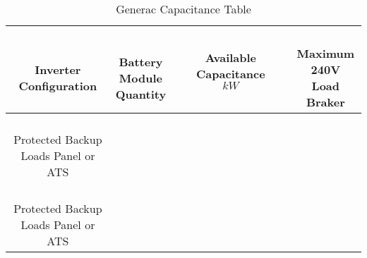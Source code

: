 \documentclass{article}
\begin{document}
\begin{table}[h!]%
\caption{Generac Capacitance Table}%
\centering%
\begin{tabular}{| c | c | c | c | }%
\hline%
\parbox{90pt}{\hfill\\[-0.3em] \centering \textbf{Inverter} \\ \textbf{Configuration}\\[0.1em]} &%
\parbox{60pt}{\hfill\\[-0.3em] \centering \textbf{Battery} \\ \textbf{Module} \\ \textbf{Quantity}\\[0.1em]} &%
\parbox{60pt}{\hfill\\[-0.3em] \centering \textbf{Available} \\ \textbf{Capacitance} \\ \textbf{\[kW\]}\\[0.1em]} &%
\parbox{60pt}{\hfill\\[-0.3em] \centering \textbf{Maximum} \\ \textbf{240V Load} \\ \textbf{Braker}\\[0.1em]} \\%
\hline
\hline
\hline
\parbox{90pt}{\hfill\\[-0.3em] \centering Protected Backup \\ Loads Panel or ATS \\[0.1em]} &%
\parbox{60pt}{\hfill\\[-0.3em]  \\[0.1em]} &%
\parbox{60pt}{\hfill\\[-0.3em]  \\[0.1em]} &%
\parbox{60pt}{\hfill\\[-0.3em]  \\[0.1em]} \\%
\hline
\parbox{90pt}{\hfill\\[-0.3em] \centering Protected Backup \\ Loads Panel or ATS \\[0.1em]} &%
\parbox{60pt}{\hfill\\[-0.3em]  \\[0.1em]} &%
\parbox{60pt}{\hfill\\[-0.3em]  \\[0.1em]} &%
\parbox{60pt}{\hfill\\[-0.3em]  \\[0.1em]} \\%

\end{tabular}
\end{table}
\end{document}
